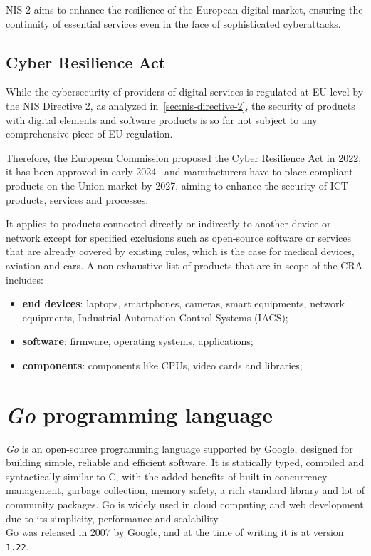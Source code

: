 NIS 2 aims to enhance the resilience of the European digital market, ensuring the continuity of essential services even in the face of sophisticated cyberattacks.

\subsection{Cyber Resilience Act}

While the cybersecurity of providers of digital services is regulated at EU level by the NIS Directive 2, as analyzed in~\cref{sec:nis-directive-2}, the security of products with digital elements and software products is so far not subject to any comprehensive piece of EU regulation.~\cite{cra-eu}

Therefore, the European Commission proposed the Cyber Resilience Act in 2022; it has been approved in early 2024~\cite{cra-timelinel} and manufacturers have to place compliant products on the Union market by 2027, aiming to enhance the security of ICT products, services and processes.

It applies to products connected directly or indirectly to another device or network except for specified exclusions such as open-source software or services that are already covered by existing rules, which is the case for medical devices, aviation and cars. A non-exhaustive list of products that are in scope of the CRA includes:~\cite{cra-overview}
\begin{itemize}
  \item \textbf{end devices}: laptops, smartphones, cameras, smart equipments, network equipments, Industrial Automation Control Systems (IACS);
  \item \textbf{software}: firmware, operating systems, applications;
  \item \textbf{components}: components like CPUs, video cards and libraries;
\end{itemize}


\section{\textit{Go} programming language}

\textit{Go} is an open-source programming language supported by Google, designed for building simple, reliable and efficient software. It is statically typed, compiled and syntactically similar to C, with the added benefits of built-in concurrency management, garbage collection, memory safety, a rich standard library and lot of community packages. Go is widely used in cloud computing and web development due to its simplicity, performance and scalability.~\cite{go-lang-site}~\cite{go-lang-wikipedia}\\
Go was released in 2007 by Google, and at the time of writing it is at version \texttt{1.22}.

